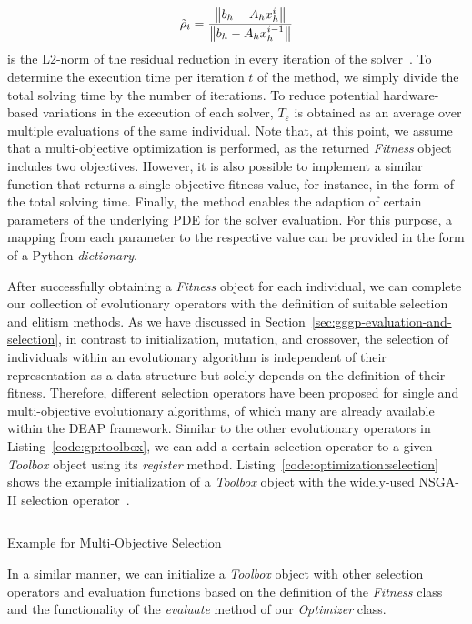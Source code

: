 \begin{equation}
	\tilde{\rho}_{i} = \frac{\norm{b_h - A_h x_{h}^i }}{\norm{b_h - A_h x^{i-1}_{h}}}
\end{equation}
is the L2-norm of the residual reduction in every iteration of the solver~\cite{trottenberg2000multigrid}.
To determine the execution time per iteration $t$ of the method, we simply divide the total solving time by the number of iterations.
To reduce potential hardware-based variations in the execution of each solver, $T_\varepsilon$ is obtained as an average over multiple evaluations of the same individual.
Note that, at this point, we assume that a multi-objective optimization is performed, as the returned \emph{Fitness} object includes two objectives.
However, it is also possible to implement a similar function that returns a single-objective fitness value, for instance, in the form of the total solving time.
Finally, the method enables the adaption of certain parameters of the underlying PDE for the solver evaluation.
For this purpose, a mapping from each parameter to the respective value can be provided in the form of a Python \emph{dictionary}.

After successfully obtaining a \emph{Fitness} object for each individual, we can complete our collection of evolutionary operators with the definition of suitable selection and elitism methods.
As we have discussed in Section~\ref{sec:gggp-evaluation-and-selection}, in contrast to initialization, mutation, and crossover, the selection of individuals within an evolutionary algorithm is independent of their representation as a data structure but solely depends on the definition of their fitness.
Therefore, different selection operators have been proposed for single and multi-objective evolutionary algorithms, of which many are already available within the DEAP framework.  
Similar to the other evolutionary operators in Listing~\ref{code:gp:toolbox}, we can add a certain selection operator to a given \emph{Toolbox} object using its \emph{register} method.
Listing~\ref{code:optimization:selection} shows the example initialization of a \emph{Toolbox} object with the widely-used NSGA-II selection operator~\cite{deb2002fast}. 
\begin{listing}
	\inputminted{python}{evostencils/optimization/selection.py}
	\caption{Example for Multi-Objective Selection}
	\label{code:optimization:selection}
\end{listing}
In a similar manner, we can initialize a \emph{Toolbox} object with other selection operators and evaluation functions based on the definition of the \emph{Fitness} class and the functionality of the \emph{evaluate} method of our \emph{Optimizer} class.

